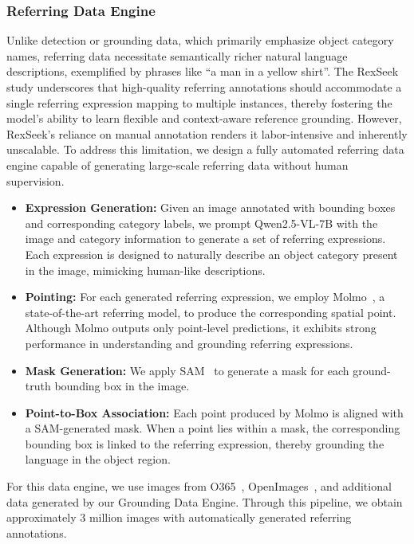 \subsubsection{Referring Data Engine}

Unlike detection or grounding data, which primarily emphasize object category names, referring data necessitate semantically richer natural language descriptions, exemplified by phrases like “a man in a yellow shirt”. The RexSeek~\cite{jiang2025referringperson} study underscores that high-quality referring annotations should accommodate a single referring expression mapping to multiple instances, thereby fostering the model's ability to learn flexible and context-aware reference grounding. However, RexSeek's reliance on manual annotation renders it labor-intensive and inherently unscalable. To address this limitation, we design a fully automated referring data engine capable of generating large-scale referring data without human supervision.

\begin{itemize}
    \item \textbf{Expression Generation:} Given an image annotated with bounding boxes and corresponding category labels, we prompt Qwen2.5-VL-7B with the image and category information to generate a set of referring expressions. Each expression is designed to naturally describe an object category present in the image, mimicking human-like descriptions.
    \item \textbf{Pointing:} For each generated referring expression, we employ Molmo~\cite{deitke2024molmo}, a state-of-the-art referring model, to produce the corresponding spatial point. Although Molmo outputs only point-level predictions, it exhibits strong performance in understanding and grounding referring expressions.
    \item \textbf{Mask Generation:} We apply SAM~\cite{TransF:SAM} to generate a mask for each ground-truth bounding box in the image.
    \item \textbf{Point-to-Box Association:} Each point produced by Molmo is aligned with a SAM-generated mask. When a point lies within a mask, the corresponding bounding box is linked to the referring expression, thereby grounding the language in the object region.
\end{itemize}

For this data engine, we use images from O365~\cite{shao2019objects365}, OpenImages~\cite{Datasets:OpenImages}, and additional data generated by our Grounding Data Engine. Through this pipeline, we obtain approximately 3 million images with automatically generated referring annotations.

